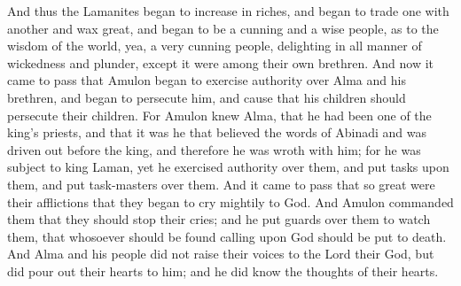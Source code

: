 And thus the Lamanites began to increase in riches, and began to trade one with another and wax great, and began to be a cunning and a wise people, as to the wisdom of the world, yea, a very cunning people, delighting in all manner of wickedness and plunder, except it were among their own brethren.
\bverse \iffalse And now it came to pass that Amulon began to exercise authority over Alma and his brethren, and began to persecute him, and cause that his children should persecute their children. \fi
And now it came to pass that Amulon began to exercise authority over Alma and his brethren, and began to persecute him, and cause that his children should persecute their children.
\bverse \iffalse For Amulon knew Alma, that he had been one of the king's priests, and that it was he that believed the words of Abinadi and was driven out before the king, and therefore he was wroth with him; for he was subject to king Laman, yet he exercised authority over them, and put tasks upon them, and put task-masters over them. \fi
For Amulon knew Alma, that he had been one of the king's priests, and that it was he that believed the words of Abinadi and was driven out before the king, and therefore he was wroth with him; for he was subject to king Laman, yet he exercised authority over them, and put tasks upon them, and put task-masters over them.
\bverse \iffalse And it came to pass that so great were their afflictions that they began to cry mightily to God. \fi
And it came to pass that so great were their afflictions that they began to cry mightily to God.
\bverse \iffalse And Amulon commanded them that they should stop their cries; and he put guards over them to watch them, that whosoever should be found calling upon God should be put to death. \fi
And Amulon commanded them that they should stop their cries; and he put guards over them to watch them, that whosoever should be found calling upon God should be put to death.
\bverse \iffalse And Alma and his people did not raise their voices to the Lord their God, but did pour out their hearts to him; and he did know the thoughts of their hearts. \fi
And Alma and his people did not raise their voices to the Lord their God, but did pour out their hearts to him; and he did know the thoughts of their hearts.
\bverse \iffalse And it came to pass that the voice of the Lord came to them in their afflictions, saying: Lift up your heads and be of good comfort, for I know of the covenant which ye have made unto me; and I will covenant with my people and deliver them out of bondage. \fi
